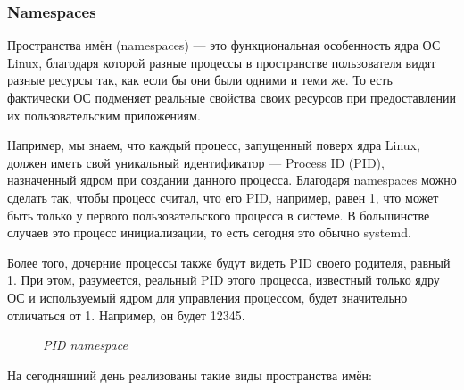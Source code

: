 \documentclass[14pt, a4paper]{article}
\begin{document}
\subsubsection*{Namespaces}

Пространства имён (namespaces) — это функциональная особенность ядра ОС Linux, благодаря
которой разные процессы в пространстве пользователя видят разные ресурсы так, как если бы они
были одними и теми же. То есть фактически ОС подменяет реальные свойства своих ресурсов при
предоставлении их пользовательским приложениям.

Например, мы знаем, что каждый процесс, запущенный поверх ядра Linux, должен иметь свой
уникальный идентификатор — Process ID (PID), назначенный ядром при создании данного процесса.
Благодаря namespaces можно сделать так, чтобы процесс считал, что его PID, например, равен 1, что
может быть только у первого пользовательского процесса в системе. В большинстве случаев это
процесс инициализации, то есть сегодня это обычно systemd.

Более того, дочерние процессы также будут видеть PID своего родителя, равный 1. При этом,
разумеется, реальный PID этого процесса, известный только ядру ОС и используемый ядром для
управления процессом, будет значительно отличаться от 1. Например, он будет 12345.

\begin{figure}[h]%
    \centering
    \caption*{\textit{PID namespace}}
    \label{1.3}
\end{figure}

На сегодняшний день реализованы такие виды пространства имён:
\end{document}
